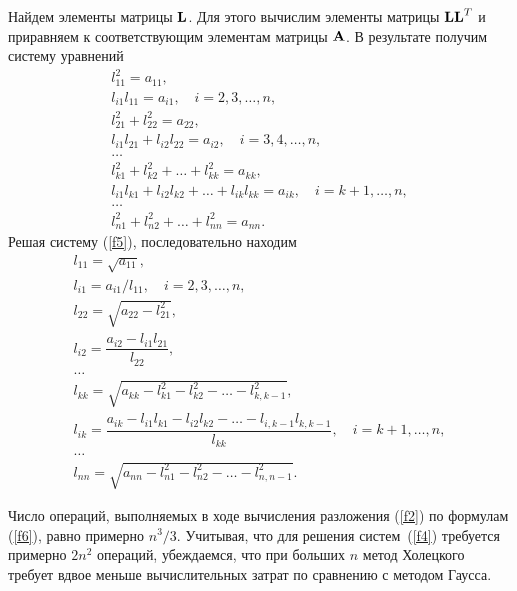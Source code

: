 \documentclass[12pt]{article}
\begin{document}
    Найдем элементы матрицы $\bold{L}$. Для этого вычислим элементы матрицы $\bold{LL}^{T}$ и приравняем к соответствующим элементам матрицы $\bold{A}$. В результате получим систему уравнений
    \begin{equation}
        \begin{array}{l}
        	l_{11}^2 = a_{11}, \\[6pt]
        	l_{i1}l_{11} = a_{i1}, \quad i = 2,3,\ldots,n, \\[6pt]
        	l_{21}^2 + l_{22}^2 = a_{22}, \\[6pt]
        	l_{i1}l_{21} + l_{i2}l_{22} = a_{i2}, \quad i=3,4,\ldots,n, \\[6pt]
        	\ldots \\[6pt]
        	l_{k1}^2 + l_{k2}^2 + \ldots + l_{kk}^2 = a_{kk}, \\[6pt]
        	l_{i1}l_{k1} + l_{i2}l_{k2} + \ldots + l_{ik}l_{kk} = a_{ik}, \quad i=k+1,\ldots,n, \\[6pt]
        	\ldots \\[6pt]
        	l_{n1}^2 + l_{n2}^2 + \ldots + l^2_{nn} = a_{nn}.
        \end{array}
		\label{f5}
    \end{equation}
    Решая систему (\ref{f5}), последовательно находим
    \begin{equation}
		\begin{array}{l}
			l_{11} = \sqrt{a_{11}}, \\[6pt]
			l_{i1} = a_{i1}/l_{11}, \quad i = 2,3,\ldots,n, \\[6pt]
			l_{22} = \sqrt{a_{22} - l_{21}^2}, \\[6pt]
			l_{i2} = \dfrac{a_{i2} - l_{i1}l_{21}}{l_{22}}, \\[6pt]
			\ldots \\[6pt]
			l_{kk} = \sqrt{a_{kk} - l_{k1}^2 - l_{k2}^2 - \ldots - l_{k,k-1}^2}, \\[6pt]
			l_{ik} = \dfrac{a_{ik} - l_{i1}l_{k1} - l_{i2}l_{k2} - \ldots - l_{i,k-1}l_{k,k-1}}{l_{kk}},
			\quad i = k+1,\ldots,n, \\[6pt]
			\ldots \\[6pt]
			l_{nn} = \sqrt{a_{nn} - l^2_{n1} - l^2_{n2} - \ldots - l^2_{n,n-1}}.
		\end{array}
		\label{f6}
    \end{equation}

    Число операций, выполняемых в ходе вычисления разложения (\ref{f2}) по формулам (\ref{f6}), равно примерно $n^3/3$. Учитывая, что для решения систем~(\ref{f4}) требуется примерно $2n^2$ операций, убеждаемся, что при больших $n$ метод Холецкого требует вдвое меньше вычислительных затрат по сравнению с методом Гаусса.
    
\end{document}

